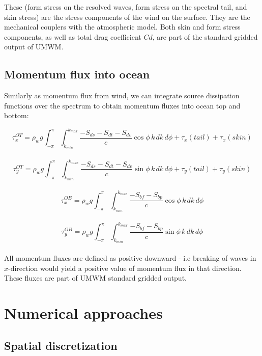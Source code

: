 \documentclass[letterpaper]{article}
\numberwithin{equation}{section}
\begin{document}
These (form stress on the resolved waves, form stress on the spectral tail, and skin stress) are the stress components of the wind on the surface.  
They are the mechanical couplers with the atmospheric model.
Both skin and form stress components, as well as total drag coefficient $Cd$,
are part of the standard gridded output of UMWM.

\subsection{Momentum flux into ocean}
\label{sec:ocean_stress}

Similarly as momentum flux from wind, we can integrate source dissipation
functions  over the spectrum to obtain momentum fluxes into ocean top and bottom:

\begin{equation}
\tau_{x}^{OT}=\rho_{w}g\int_{-\pi}^{\pi}\!\int_{k_{min}}^{k_{max}}\dfrac{-S_{ds}-S_{dt}-S_{dv}}{c}\cos{\phi}\,k\,dk\,d\phi 
+ \tau_{x}(tail) + \tau_{x}(skin) 
\end{equation}
\\
\begin{equation}
\tau_{y}^{OT}=\rho_{w}g\int_{-\pi}^{\pi}\!\int_{k_{min}}^{k_{max}}\dfrac{-S_{ds}-S_{dt}-S_{dv}}{c}\sin{\phi}\,k\,dk\,d\phi 
+ \tau_{y}(tail) + \tau_{y}(skin) 
\end{equation}
\\
\begin{equation}
\tau_{x}^{OB}=\rho_{w}g\int_{-\pi}^{\pi}\!\int_{k_{min}}^{k_{max}}\dfrac{-S_{bf}-S_{bp}}{c}\cos{\phi}\,k\,dk\,d\phi
\end{equation}
\\
\begin{equation}
\tau_{y}^{OB}=\rho_{w}g\int_{-\pi}^{\pi}\!\int_{k_{min}}^{k_{max}}\dfrac{-S_{bf}-S_{bp}}{c}\sin{\phi}\,k\,dk\,d\phi
\end{equation}
\\
All momentum fluxes are defined as positive downward - i.e breaking of waves
in $x$-direction would yield a positive value of momentum flux in that direction.
These fluxes are part of UMWM standard gridded output.

\newpage
\section{Numerical approaches}

\subsection{Spatial discretization}
\end{document}
